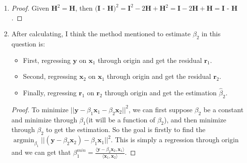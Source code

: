 \documentclass[12pt]{article}
\DeclareMathOperator*{\argmin}{argmin}
\newcommand{\ttt}[1]{\textbf{#1}}
\newcommand{\la}{\langle}
\newcommand{\ra}{\rangle}
\begin{document}
\begin{enumerate}
    \item
    \begin{proof}
        Given $\textbf{H}^2 = \textbf{H}$, then $\textbf{(I - H)}^2 = \textbf{I}^2 - 2 \textbf{H} + \textbf{H}^2 = \textbf{I} - 2 \textbf{H} + \textbf{H} = \textbf{I - H}$.
    \end{proof}
    \item
    After calculating, I think the method mentioned to estimate $\beta_2$ in this question is:
    \begin{itemize}
        \item First, regressing $\ttt{y}$ on $\ttt{x}_1$ through origin and get the residual $\ttt{r}_1$.
        \item Second, regressing $\ttt{x}_2$ on $\ttt{x}_1$ through origin and get the residual $\ttt{r}_2$.
        \item Finally, regressing $\ttt{r}_1$ on $\ttt{r}_2$ through origin and get the estimation $\hat{\beta}_2$.
    \end{itemize}
    \begin{proof}
        To minimize $||\ttt{y} - \beta_1 \ttt{x}_1 - \beta_2 \ttt{x}_2||^2$, we can first suppose $\beta_2$ be a constant and minimize through $\beta_1$(it will be a function of $\beta_2$), and then minimize through $\beta_2$ to get the estimation.
        So the goal is firstly to find the $\argmin_{\beta_1} ||(\ttt{y} - \beta_2 \ttt{x}_2) - \beta_1 \ttt{x}_1||^2$. This is simply a regression through origin and we can get that
        $\beta_1^{min} = \frac{\la \ttt{y} - \beta_2 \ttt{x}_2, \ttt{x}_1 \ra}{\la \ttt{x}_1, \ttt{x}_2 \ra}$.


\end{proof}
\end{enumerate}
\end{document}
